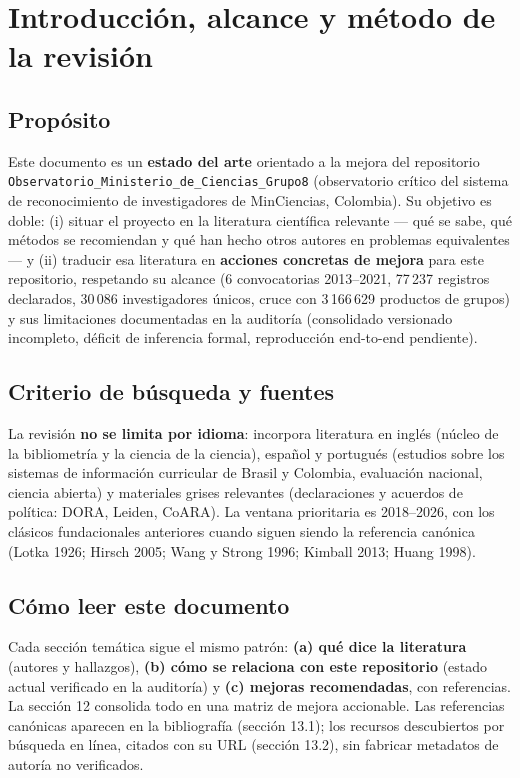 \section{Introducción, alcance y método de la revisión}

\subsection{Propósito}

Este documento es un \textbf{estado del arte} orientado a la mejora del
repositorio \texttt{Observatorio\_Ministerio\_de\_Ciencias\_Grupo8} (observatorio
crítico del sistema de reconocimiento de investigadores de MinCiencias,
Colombia). Su objetivo es doble: (i) situar el proyecto en la literatura
científica relevante — qué se sabe, qué métodos se recomiendan y qué han hecho
otros autores en problemas equivalentes — y (ii) traducir esa literatura en
\textbf{acciones concretas de mejora} para este repositorio, respetando su
alcance (6 convocatorias 2013--2021, 77\,237 registros declarados, 30\,086
investigadores únicos, cruce con 3\,166\,629 productos de grupos) y sus
limitaciones documentadas en la auditoría (consolidado versionado incompleto,
déficit de inferencia formal, reproducción end-to-end pendiente).

\subsection{Criterio de búsqueda y fuentes}

La revisión \textbf{no se limita por idioma}: incorpora literatura en inglés
(núcleo de la bibliometría y la ciencia de la ciencia), español y portugués
(estudios sobre los sistemas de información curricular de Brasil y Colombia,
evaluación nacional, ciencia abierta) y materiales grises relevantes
(declaraciones y acuerdos de política: DORA, Leiden, CoARA). La ventana
prioritaria es 2018--2026, con los clásicos fundacionales anteriores cuando
siguen siendo la referencia canónica (Lotka 1926; Hirsch 2005; Wang y Strong
1996; Kimball 2013; Huang 1998).

\subsection{Cómo leer este documento}

Cada sección temática sigue el mismo patrón: \textbf{(a) qué dice la
literatura} (autores y hallazgos), \textbf{(b) cómo se relaciona con este
repositorio} (estado actual verificado en la auditoría) y \textbf{(c) mejoras
recomendadas}, con referencias. La sección 12 consolida todo en una matriz de
mejora accionable. Las referencias canónicas aparecen en la bibliografía
(sección 13.1); los recursos descubiertos por búsqueda en línea, citados con
su URL (sección 13.2), sin fabricar metadatos de autoría no verificados.


